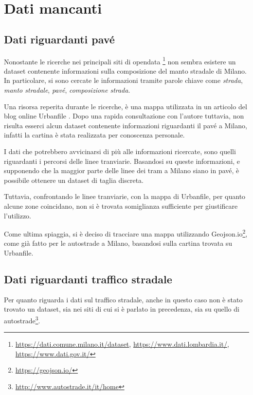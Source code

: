 \documentclass[a4paper,12pt]{report}
\newcommand{\quotestyle}[1]{\textit{#1}}
\begin{document}
\section{Dati mancanti}

\subsection{Dati riguardanti pavé}

Nonostante le ricerche nei principali siti di opendata
\footnote{
    \url{https://dati.comune.milano.it/dataset}, 
    \url{https://www.dati.lombardia.it/},
    \url{https://www.dati.gov.it/}}
non sembra esistere un dataset contenente informazioni sulla composizione del 
manto stradale di Milano. 
In particolare, si sono cercate le informazioni tramite parole chiave come 
\quotestyle{strada}, \quotestyle{manto stradale}, \quotestyle{pavé}, 
\quotestyle{composizione strada}. 

Una risorsa reperita durante le ricerche, è una mappa utilizzata in un articolo del blog online 
Urbanfile \cite{URBANFILE:1}. 
Dopo una rapida consultazione con l'autore tuttavia, non risulta esserci alcun 
dataset contenente informazioni riguardanti il pavé a Milano, infatti la cartina è 
stata realizzata per conoscenza personale. 

I dati che potrebbero avvicinarsi di più alle informazioni ricercate, 
sono quelli riguardanti i percorsi delle linee tranviarie. 
Basandosi su queste informazioni, e supponendo che la maggior parte delle linee dei 
tram a Milano siano in pavé, è possibile ottenere un dataset di taglia discreta. 

Tuttavia, confrontando le linee tranviarie, con la mappa di Urbanfile, 
per quanto alcune zone coincidano, non si è trovata 
somiglianza sufficiente per giustificare l'utilizzo. 

Come ultima spiaggia, si è deciso di tracciare una mappa utilizzando 
Geojson.io\footnote{\url{https://geojson.io/}}, come già fatto per le autostrade a Milano, 
basandosi sulla cartina trovata su Urbanfile. 

\subsection{Dati riguardanti traffico stradale}

Per quanto riguarda i dati sul traffico stradale, anche in questo caso non è stato trovato un 
dataset, sia nei siti di cui si è parlato in precedenza, sia su quello di 
autostrade\footnote{\url{http://www.autostrade.it/it/home}}. 
\end{document}

